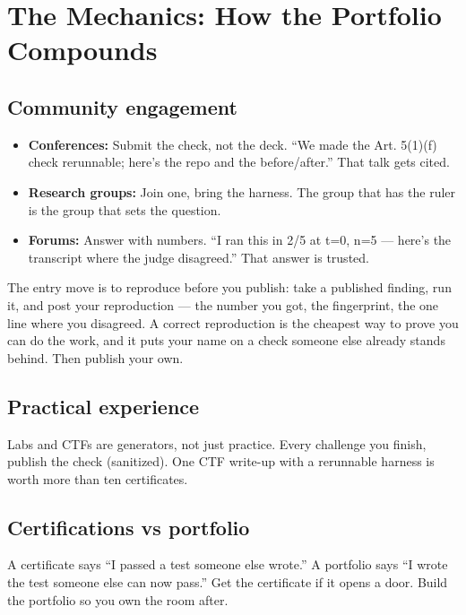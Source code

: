 \section{The Mechanics: How the Portfolio Compounds}
\tierP

\subsection{Community engagement}
\begin{itemize}
\item \textbf{Conferences:} Submit the check, not the deck. ``We made the Art. 5(1)(f) check rerunnable; here's the repo and the before/after.'' That talk gets cited.
\item \textbf{Research groups:} Join one, bring the harness. The group that has the ruler is the group that sets the question.
\item \textbf{Forums:} Answer with numbers. ``I ran this in 2/5 at t=0, n=5 — here's the transcript where the judge disagreed.'' That answer is trusted.
\end{itemize}

The entry move is to reproduce before you publish: take a published finding, run it, and post your reproduction — the number you got, the fingerprint, the one line where you disagreed. A correct reproduction is the cheapest way to prove you can do the work, and it puts your name on a check someone else already stands behind. Then publish your own.

\subsection{Practical experience}
Labs and CTFs are generators, not just practice. Every challenge you finish, publish the check (sanitized). One CTF write-up with a rerunnable harness is worth more than ten certificates.

\subsection{Certifications vs portfolio}
A certificate says ``I passed a test someone else wrote.'' A portfolio says ``I wrote the test someone else can now pass.'' Get the certificate if it opens a door. Build the portfolio so you own the room after.

